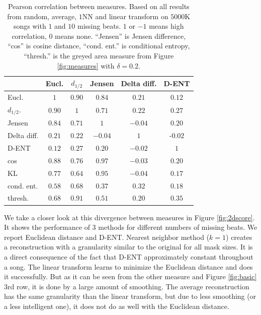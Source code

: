 \documentclass{article}
\begin{document}
\begin{table}[t]
\begin{small}
\begin{center}
\begin{tabular}{|l|c|c|c|c|c|} \hline
 & Eucl. & $d_{1/2}$ & Jensen & Delta diff. & D-ENT \\ \hline
Eucl. & $1$ & $0.90$ & $0.84$ & $0.21$ & $0.12$ \\ 
$d_{1/2}$. & $0.90$ & $1$ & $0.71$ & $0.22$ & $0.27$ \\ 
Jensen & $0.84$ & $0.71$ & $1$ & $-0.04$ & $0.20$ \\ \hline 
Delta diff. & $\mathbf{0.21}$ & $0.22$ & $-0.04$ & $1$ & -$0.02$ \\ 
D-ENT & $\mathbf{0.12}$ & $0.27$ & $0.20$ & $-0.02$ & $1$ \\ \hline
cos & $0.88$ & $0.76$ & $0.97$ & $-0.03$ & $0.20$ \\
KL & $0.77$ & $0.64$ & $0.95$ & $-0.04$ & $0.17$ \\ 
cond. ent. & $0.58$ & $0.68$ & $0.37$ & $0.32$ & $0.18$ \\
thresh. & $0.68$ & $0.91$ & $0.51$ & $0.20$ & $0.35$ \\ \hline
\end{tabular}
\caption{Pearson correlation between measures. Based on all results
  from random, average, $1$NN and linear transform on $5000$K songs
  with $1$ and $10$ missing beats. $1$ or $-1$ means high correlation,
  $0$ means none. ``Jensen'' is Jensen difference, ``cos'' is cosine
  distance, ``cond. ent.'' is conditional entropy, ``thresh.'' is the
  greyed area measure from Figure \ref{fig:measures} with $\delta =
  0.2$.
\label{tab:corrs}}
\end{center}
\end{small}
\end{table}

We take a closer look at this divergence between measures in Figure
\ref{fig:2dscore}.  It shows the performance of $3$ methods for
different numbers of missing beats. We report Euclidean distance and
D-ENT.  Nearest neighbor method ($k=1$) creates a reconstruction with
a granularity similar to the original for all mask sizes. It is a
direct consequence of the fact that D-ENT approximately constant
throughout a song. The linear transform learns to minimize the
Euclidean distance and does it successfully. But as it can be seen
from the other measure and Figure \ref{fig:basic} $3$rd row, it is
done by a large amount of smoothing. The average reconstruction has
the same granularity than the linear transform, but due to less
smoothing (or a less intelligent one), it does not do as well with the
Euclidean distance.
\end{document}

